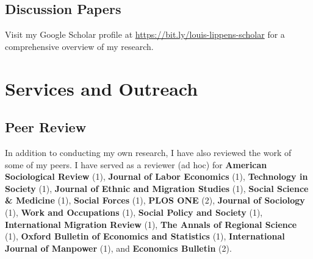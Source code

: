 \documentclass[11pt,a4paper,]{awesome-cv}
\begin{document}
\medskip

\hypertarget{discussion-papers}{%
\subsection{Discussion Papers}\label{discussion-papers}}

\begin{cvhonors}
\end{cvhonors}

\scriptsize

Visit my Google Scholar profile at
\url{https://bit.ly/louis-lippens-scholar} for a comprehensive overview
of my research. \normalsize

\hypertarget{services-and-outreach}{%
\section{Services and Outreach}\label{services-and-outreach}}

\medskip

\hypertarget{peer-review}{%
\subsection{Peer Review}\label{peer-review}}

\footnotesize

In addition to conducting my own research, I have also reviewed the work
of some of my peers. I have served as a reviewer (ad hoc) for
\textbf{American Sociological Review} (1), \textbf{Journal of Labor
Economics} (1), \textbf{Technology in Society} (1), \textbf{Journal of
Ethnic and Migration Studies} (1), \textbf{Social Science \& Medicine}
(1), \textbf{Social Forces} (1), \textbf{PLOS ONE} (2), \textbf{Journal
of Sociology} (1), \textbf{Work and Occupations} (1), \textbf{Social
Policy and Society} (1), \textbf{International Migration Review} (1),
\textbf{The Annals of Regional Science} (1), \textbf{Oxford Bulletin of
Economics and Statistics} (1), \textbf{International Journal of
Manpower} (1), and \textbf{Economics Bulletin} (2). \normalsize
\end{document}
